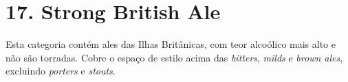 \section*{17. Strong British Ale}

Esta categoria contém ales das Ilhas Britânicas, com teor alcoólico mais alto e não são torradas. Cobre o espaço de estilo acima das \textit{bitters}, \textit{milds} e \textit{brown ales}, excluindo \textit{porters} e \textit{stouts}.
